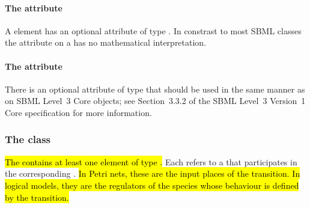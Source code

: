 \paragraph{The  attribute}
A \Transition element has an optional  attribute of type .  In constrast to most SBML classes the  attribute on a \Transition has no mathematical interpretation.

\paragraph{The  attribute}
There is an optional  attribute of type  that should be used
in the same manner as on SBML Level~3 Core
objects; see Section~3.3.2 of the SBML Level~3 Version~1 Core
specification for more information.

%
%

\subsubsection{The  class}
\label{input-class}
\hl{The \ListOfInputs contains at least one element of type \Input. }
Each \Input refers to a \QualitativeSpecies that participates in the corresponding \Transition.
\hl{In Petri nets, these are the input places of the transition. In logical models, they are the regulators of the species whose behaviour is defined by the transition.}


